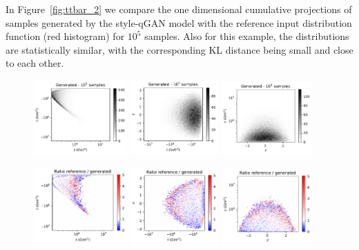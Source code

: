 \documentclass[twocolumn,preprintnumbers,superscriptaddress]{revtex4-2}
\begin{document}
In Figure~\ref{fig:ttbar_2} we compare the one dimensional cumulative
projections of samples generated by the style-qGAN model with the reference
input distribution function (red histogram) for $10^5$ samples. Also for this
example, the distributions are statistically similar, with
the corresponding KL distance being small and close to each other.

\begin{figure}
  \includegraphics[width=0.32\textwidth]{plots/LHCttbar/s-t_FAKE_100k.pdf}%
  \includegraphics[width=0.3\textwidth]{plots/LHCttbar/t-y_FAKE_100k.pdf}%
  \includegraphics[width=0.31\textwidth]{plots/LHCttbar/y-s_FAKE_100k.pdf}

  \includegraphics[width=0.32\textwidth]{plots/LHCttbar/s-t_RATIO_100k.pdf}%
  \includegraphics[width=0.3\textwidth]{plots/LHCttbar/t-y_RATIO_100k.pdf}%
  \includegraphics[width=0.31\textwidth]{plots/LHCttbar/y-s_RATIO_100k.pdf}


\end{figure}
\end{document}
